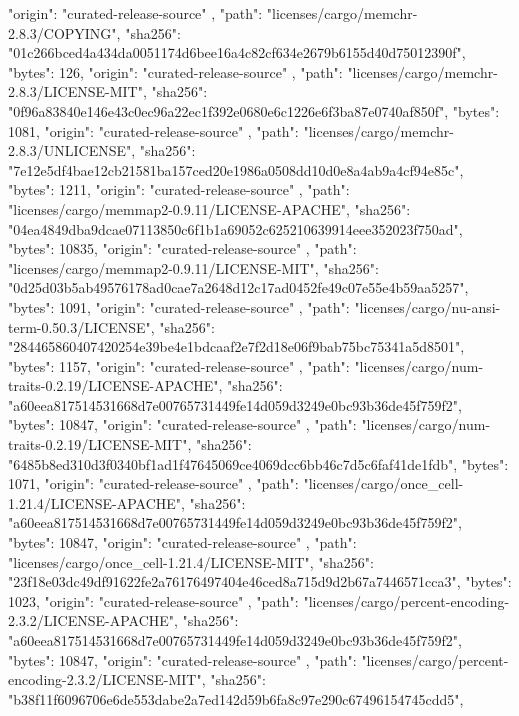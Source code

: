 {{      "origin": "curated-release-source"
    },
    {
      "path": "licenses/cargo/memchr-2.8.3/COPYING",
      "sha256": "01c266bced4a434da0051174d6bee16a4c82cf634e2679b6155d40d75012390f",
      "bytes": 126,
      "origin": "curated-release-source"
    },
    {
      "path": "licenses/cargo/memchr-2.8.3/LICENSE-MIT",
      "sha256": "0f96a83840e146e43c0ec96a22ec1f392e0680e6c1226e6f3ba87e0740af850f",
      "bytes": 1081,
      "origin": "curated-release-source"
    },
    {
      "path": "licenses/cargo/memchr-2.8.3/UNLICENSE",
      "sha256": "7e12e5df4bae12cb21581ba157ced20e1986a0508dd10d0e8a4ab9a4cf94e85c",
      "bytes": 1211,
      "origin": "curated-release-source"
    },
    {
      "path": "licenses/cargo/memmap2-0.9.11/LICENSE-APACHE",
      "sha256": "04ea4849dba9dcae07113850c6f1b1a69052c625210639914eee352023f750ad",
      "bytes": 10835,
      "origin": "curated-release-source"
    },
    {
      "path": "licenses/cargo/memmap2-0.9.11/LICENSE-MIT",
      "sha256": "0d25d03b5ab49576178ad0cae7a2648d12c17ad0452fe49c07e55e4b59aa5257",
      "bytes": 1091,
      "origin": "curated-release-source"
    },
    {
      "path": "licenses/cargo/nu-ansi-term-0.50.3/LICENSE",
      "sha256": "284465860407420254e39be4e1bdcaaf2e7f2d18e06f9bab75bc75341a5d8501",
      "bytes": 1157,
      "origin": "curated-release-source"
    },
    {
      "path": "licenses/cargo/num-traits-0.2.19/LICENSE-APACHE",
      "sha256": "a60eea817514531668d7e00765731449fe14d059d3249e0bc93b36de45f759f2",
      "bytes": 10847,
      "origin": "curated-release-source"
    },
    {
      "path": "licenses/cargo/num-traits-0.2.19/LICENSE-MIT",
      "sha256": "6485b8ed310d3f0340bf1ad1f47645069ce4069dcc6bb46c7d5c6faf41de1fdb",
      "bytes": 1071,
      "origin": "curated-release-source"
    },
    {
      "path": "licenses/cargo/once_cell-1.21.4/LICENSE-APACHE",
      "sha256": "a60eea817514531668d7e00765731449fe14d059d3249e0bc93b36de45f759f2",
      "bytes": 10847,
      "origin": "curated-release-source"
    },
    {
      "path": "licenses/cargo/once_cell-1.21.4/LICENSE-MIT",
      "sha256": "23f18e03dc49df91622fe2a76176497404e46ced8a715d9d2b67a7446571cca3",
      "bytes": 1023,
      "origin": "curated-release-source"
    },
    {
      "path": "licenses/cargo/percent-encoding-2.3.2/LICENSE-APACHE",
      "sha256": "a60eea817514531668d7e00765731449fe14d059d3249e0bc93b36de45f759f2",
      "bytes": 10847,
      "origin": "curated-release-source"
    },
    {
      "path": "licenses/cargo/percent-encoding-2.3.2/LICENSE-MIT",
      "sha256": "b38f11f6096706e6de553dabe2a7ed142d59b6fa8c97e290c67496154745cdd5",
}}
